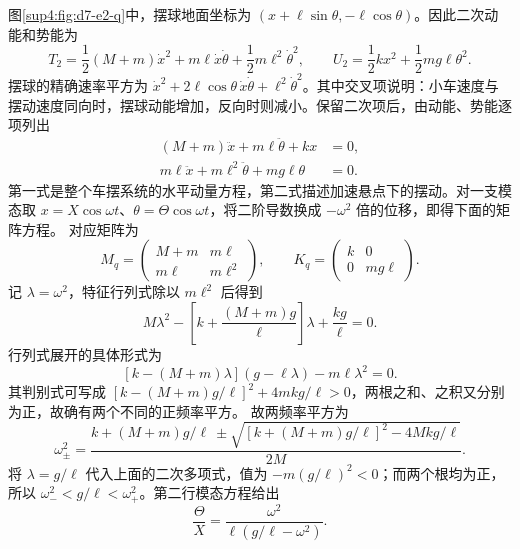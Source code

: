 \begin{solution}
图\ref{sup4:fig:d7-e2-q}中，摆球地面坐标为 $(x+\ell\sin\theta,-\ell\cos\theta)$。因此二次动能和势能为
\[
T_2=\frac12(M+m)\dot x^2+m\ell\dot x\dot\theta
+\frac12m\ell^2\dot\theta^2,
\qquad U_2=\frac12kx^2+\frac12mg\ell\theta^2.
\]
摆球的精确速率平方为 $\dot x^2+2\ell\cos\theta\,\dot x\dot\theta+\ell^2\dot\theta^2$。其中交叉项说明：小车速度与摆动速度同向时，摆球动能增加，反向时则减小。保留二次项后，由动能、势能逐项列出
\[
\begin{aligned}
(M+m)\ddot x+m\ell\ddot\theta+kx&=0,\\
m\ell\ddot x+m\ell^2\ddot\theta+mg\ell\theta&=0.
\end{aligned}
\]
第一式是整个车摆系统的水平动量方程，第二式描述加速悬点下的摆动。对一支模态取 $x=X\cos\omega t$、$\theta=\Theta\cos\omega t$，将二阶导数换成 $-\omega^2$ 倍的位移，即得下面的矩阵方程。
对应矩阵为
\[
M_q=\begin{pmatrix}M+m&m\ell\\m\ell&m\ell^2\end{pmatrix},
\qquad K_q=\begin{pmatrix}k&0\\0&mg\ell\end{pmatrix}.
\]
记 $\lambda=\omega^2$，特征行列式除以 $m\ell^2$ 后得到
\[
M\lambda^2-\left[k+\frac{(M+m)g}{\ell}\right]\lambda
+\frac{kg}{\ell}=0.
\]
行列式展开的具体形式为
\[
[k-(M+m)\lambda](g-\ell\lambda)-m\ell\lambda^2=0.
\]
其判别式可写成 $[k-(M+m)g/\ell]^2+4mkg/\ell>0$，两根之和、之积又分别为正，故确有两个不同的正频率平方。
故两频率平方为
\[
\boxed{\omega_{\pm}^2=
\frac{k+(M+m)g/\ell\ \pm\sqrt{[k+(M+m)g/\ell]^2-4Mkg/\ell}}{2M}.}
\]
将 $\lambda=g/\ell$ 代入上面的二次多项式，值为 $-m(g/\ell)^2<0$；而两个根均为正，所以 $\omega_-^2<g/\ell<\omega_+^2$。第二行模态方程给出
\[
\frac{\Theta}{X}=\frac{\omega^2}{\ell(g/\ell-\omega^2)}.
\]
\begin{figure}[H]\centering
{}
\end{figure}
\end{solution}
